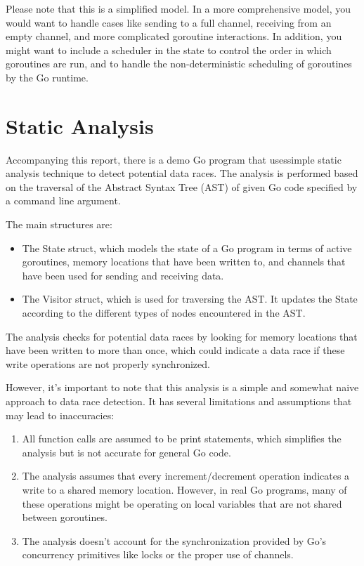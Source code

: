 \documentclass[12pt]{article}
\begin{document}
Please note that this is a simplified model. In a more comprehensive model, you would want to handle cases like sending to a full channel, receiving from an empty channel, and more complicated goroutine interactions. In addition, you might want to include a scheduler in the state to control the order in which goroutines are run, and to handle the non-deterministic scheduling of goroutines by the Go runtime.

\section{Static Analysis}

Accompanying this report, there is a demo Go program that usessimple static analysis technique to detect potential data races. The analysis is performed based on the traversal of the Abstract Syntax Tree (AST) of given Go code specified by a command line argument.

The main structures are:

\begin{itemize}
    \item The State struct, which models the state of a Go program in terms of active goroutines, memory locations that have been written to, and channels that have been used for sending and receiving data.
    \item The Visitor struct, which is used for traversing the AST. It updates the State according to the different types of nodes encountered in the AST.
\end{itemize}

The analysis checks for potential data races by looking for memory locations that have been written to more than once, which could indicate a data race if these write operations are not properly synchronized.

However, it's important to note that this analysis is a simple and somewhat naive approach to data race detection. It has several limitations and assumptions that may lead to inaccuracies:

\begin{enumerate}
    \item All function calls are assumed to be print statements, which simplifies the analysis but is not accurate for general Go code.
    \item The analysis assumes that every increment/decrement operation indicates a write to a shared memory location. However, in real Go programs, many of these operations might be operating on local variables that are not shared between goroutines.
    \item The analysis doesn't account for the synchronization provided by Go's concurrency primitives like locks or the proper use of channels.
\end{enumerate}
\end{document}
